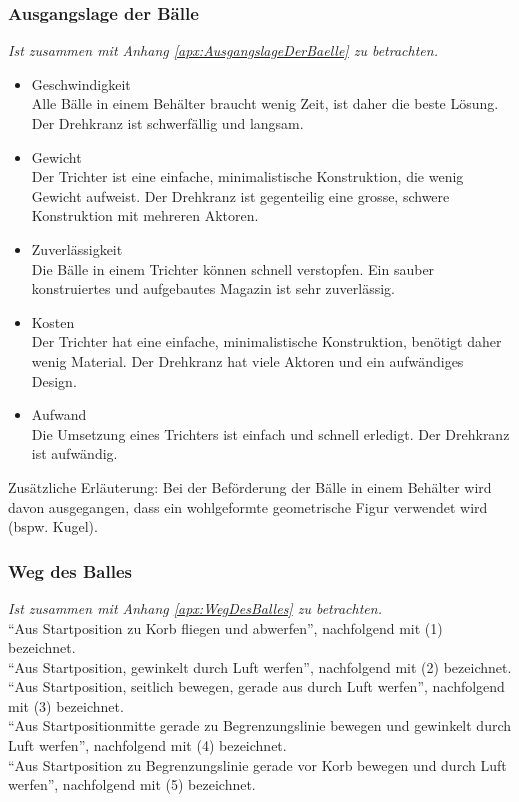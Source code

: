		\subsubsection{Ausgangslage der Bälle}
			\textit{Ist zusammen mit Anhang \ref{apx:AusgangslageDerBaelle} zu betrachten.}
			\begin{itemize}
				\item Geschwindigkeit\\
				Alle Bälle in einem Behälter braucht wenig Zeit, ist daher die beste Lösung. Der Drehkranz ist schwerfällig und langsam.
				\item Gewicht\\
				Der Trichter ist eine einfache, minimalistische Konstruktion, die wenig Gewicht aufweist. Der Drehkranz ist gegenteilig eine grosse, schwere Konstruktion mit mehreren Aktoren.
				\item Zuverlässigkeit\\
				Die Bälle in einem Trichter können schnell verstopfen. Ein sauber konstruiertes und aufgebautes Magazin ist sehr zuverlässig. 
				\item Kosten\\
				Der Trichter hat eine einfache, minimalistische Konstruktion, benötigt daher wenig Material. Der Drehkranz hat viele Aktoren und ein aufwändiges Design.
				\item Aufwand\\
				Die Umsetzung eines Trichters ist einfach und schnell erledigt. Der Drehkranz ist aufwändig.					
			\end{itemize}
			Zusätzliche Erläuterung: Bei der Beförderung der Bälle in einem Behälter wird davon ausgegangen, dass ein wohlgeformte geometrische Figur verwendet wird (bspw. Kugel).
			
			
		\subsubsection{Weg des Balles}
		\textit{Ist zusammen mit Anhang \ref{apx:WegDesBalles} zu betrachten.}\\		
		\enquote{Aus Startposition zu Korb fliegen und abwerfen}, nachfolgend mit (1) bezeichnet.\\	
		\enquote{Aus Startposition, gewinkelt durch Luft werfen}, nachfolgend mit (2) bezeichnet.\\
		\enquote{Aus Startposition, seitlich bewegen, gerade aus durch Luft werfen}, nachfolgend mit (3) bezeichnet.\\
		\enquote{Aus Startpositionmitte gerade zu Begrenzungslinie bewegen und gewinkelt durch Luft werfen}, nachfolgend mit (4) bezeichnet.\\
		\enquote{Aus Startposition zu Begrenzungslinie gerade vor Korb bewegen und durch Luft werfen}, nachfolgend mit (5) bezeichnet.\\	
				
